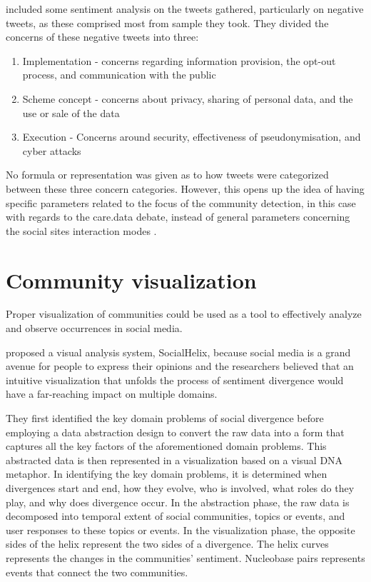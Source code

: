  included some sentiment analysis on the tweets gathered, particularly on negative tweets, as these comprised most from sample they took. They divided the concerns of these negative tweets into three:


\begin{enumerate}
	\item Implementation - concerns regarding information provision, the opt-out process, and communication with the public
	\item Scheme concept - concerns about privacy, sharing of personal data, and the use or sale of the data
	\item Execution - Concerns around security, effectiveness of pseudonymisation, and cyber attacks
	
\end{enumerate}


No formula or representation was given as to how tweets were categorized between these three concern categories. However, this opens up the idea of having specific parameters related to the focus of the community detection, in this case with regards to the care.data debate, instead of general parameters concerning the social site\vtick s interaction modes \cite{Amor:2015}.


\section{Community visualization}


Proper visualization of communities could be used as a tool to effectively analyze and observe occurrences in social media.


 proposed a visual analysis system, SocialHelix, because social media is a grand avenue for people to express their opinions and the researchers believed that an intuitive visualization that unfolds the process of sentiment divergence would have a far-reaching impact on multiple domains. 


They first identified the key domain problems of social divergence before employing a data abstraction design to convert the raw data into a form that captures all the key factors of the aforementioned domain problems. This abstracted data is then represented in a visualization based on a visual DNA metaphor. In identifying the key domain problems, it is determined when divergences start and end, how they evolve, who is involved, what roles do they play, and why does divergence occur. In the abstraction phase, the raw data is decomposed into temporal extent of social communities, topics or events, and user responses to these topics or events. In the visualization phase, the opposite sides of the helix represent the two sides of a divergence. The helix curves represents the changes in the communities’ sentiment. Nucleobase pairs represents events that connect the two communities. 


